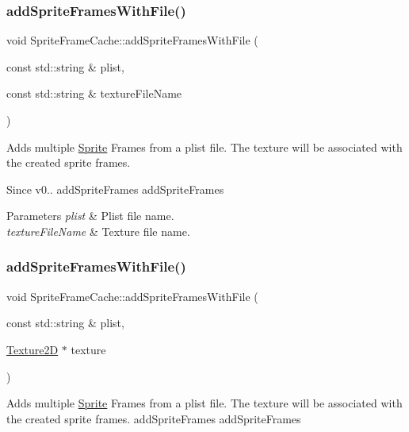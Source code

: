 \subsubsection{\texorpdfstring{add\+Sprite\+Frames\+With\+File()}{addSpriteFramesWithFile()}\hspace{0.1cm}{\footnotesize\ttfamily [2/6]}}
{\footnotesize\ttfamily void Sprite\+Frame\+Cache\+::add\+Sprite\+Frames\+With\+File (\begin{DoxyParamCaption}\item[{const std\+::string \&}]{plist,  }\item[{const std\+::string \&}]{texture\+File\+Name }\end{DoxyParamCaption})}

Adds multiple \hyperlink{classSprite}{Sprite} Frames from a plist file. The texture will be associated with the created sprite frames. \begin{DoxySince}{Since}
v0..  add\+Sprite\+Frames  add\+Sprite\+Frames
\end{DoxySince}

\begin{DoxyParams}{Parameters}
{\em plist} & Plist file name. \\
\hline
{\em texture\+File\+Name} & Texture file name. \\
\hline
\end{DoxyParams}
\mbox{\label{classSpriteFrameCache_a0cadaca840049f5009c7b2a288a9bd70}} 
\subsubsection{\texorpdfstring{add\+Sprite\+Frames\+With\+File()}{addSpriteFramesWithFile()}\hspace{0.1cm}{\footnotesize\ttfamily [3/6]}}
{\footnotesize\ttfamily void Sprite\+Frame\+Cache\+::add\+Sprite\+Frames\+With\+File (\begin{DoxyParamCaption}\item[{const std\+::string \&}]{plist,  }\item[{\hyperlink{classTexture2D}{Texture2D} $\ast$}]{texture }\end{DoxyParamCaption})}

Adds multiple \hyperlink{classSprite}{Sprite} Frames from a plist file. The texture will be associated with the created sprite frames.  add\+Sprite\+Frames  add\+Sprite\+Frames


